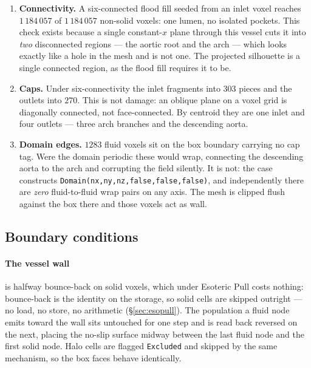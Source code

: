 \documentclass[11pt,a4paper]{article}
\newcommand{\code}[1]{\texttt{\small #1}}
\begin{document}
\begin{enumerate}[leftmargin=1.4em,itemsep=3pt]
\item \textbf{Connectivity.} A six-connected flood fill seeded from an inlet
  voxel reaches $1\,184\,057$ of $1\,184\,057$ non-solid voxels: one lumen, no
  isolated pockets. This check exists because a single constant-$x$ plane
  through this vessel cuts it into \emph{two} disconnected regions --- the aortic
  root and the arch --- which looks exactly like a hole in the mesh and is not
  one. The projected silhouette is a single connected region, as the flood fill
  requires it to be.

\item \textbf{Caps.} Under six-connectivity the inlet fragments into $303$ pieces
  and the outlets into $270$. This is not damage: an oblique plane on a voxel
  grid is diagonally connected, not face-connected. By centroid they are one
  inlet and four outlets --- three arch branches and the descending aorta.

\item \textbf{Domain edges.} $1283$ fluid voxels sit on the box boundary carrying
  no cap tag. Were the domain periodic these would wrap, connecting the
  descending aorta to the arch and corrupting the field silently. It is not:
  the case constructs \code{Domain(nx,ny,nz,false,false,false)}, and
  independently there are \emph{zero} fluid-to-fluid wrap pairs on any axis. The
  mesh is clipped flush against the box there and those voxels act as wall.
\end{enumerate}

\subsection{Boundary conditions}
\label{sec:aortabc}

\paragraph{The vessel wall} is halfway bounce-back on solid voxels, which under
Esoteric Pull costs nothing: bounce-back is the identity on the storage, so solid
cells are skipped outright --- no load, no store, no arithmetic
(\S\ref{sec:esopull}). The population a fluid node emits toward the wall sits
untouched for one step and is read back reversed on the next, placing the no-slip
surface midway between the last fluid node and the first solid node. Halo cells
are flagged \code{Excluded} and skipped by the same mechanism, so the box faces
behave identically.
\end{document}

